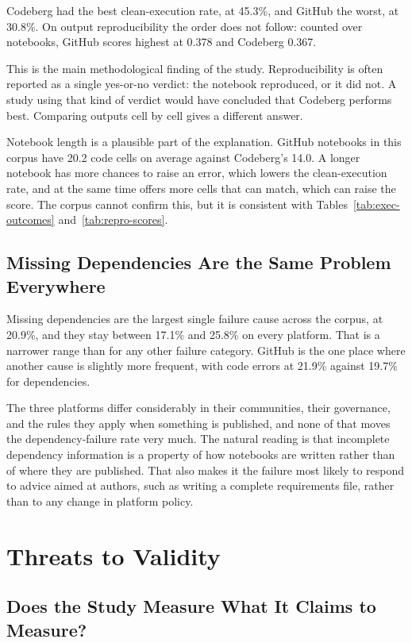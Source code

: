 Codeberg had the best clean-execution rate, at 45.3\%, and GitHub the worst, at 30.8\%. On output reproducibility the order does not follow: counted over notebooks, GitHub scores highest at 0.378 and Codeberg 0.367.

This is the main methodological finding of the study. Reproducibility is often reported as a single yes-or-no verdict: the notebook reproduced, or it did not. A study using that kind of verdict would have concluded that Codeberg performs best. Comparing outputs cell by cell gives a different answer.

Notebook length is a plausible part of the explanation. GitHub notebooks in this corpus have 20.2 code cells on average against Codeberg's 14.0. A longer notebook has more chances to raise an error, which lowers the clean-execution rate, and at the same time offers more cells that can match, which can raise the score. The corpus cannot confirm this, but it is consistent with Tables~\ref{tab:exec-outcomes} and~\ref{tab:repro-scores}.

\subsection{Missing Dependencies Are the Same Problem Everywhere}

Missing dependencies are the largest single failure cause across the corpus, at 20.9\%, and they stay between 17.1\% and 25.8\% on every platform. That is a narrower range than for any other failure category. GitHub is the one place where another cause is slightly more frequent, with code errors at 21.9\% against 19.7\% for dependencies.

The three platforms differ considerably in their communities, their governance, and the rules they apply when something is published, and none of that moves the dependency-failure rate very much. The natural reading is that incomplete dependency information is a property of how notebooks are written rather than of where they are published. That also makes it the failure most likely to respond to advice aimed at authors, such as writing a complete requirements file, rather than to any change in platform policy.

\section{Threats to Validity}
\label{sec:threats}

\subsection{Does the Study Measure What It Claims to Measure?}

